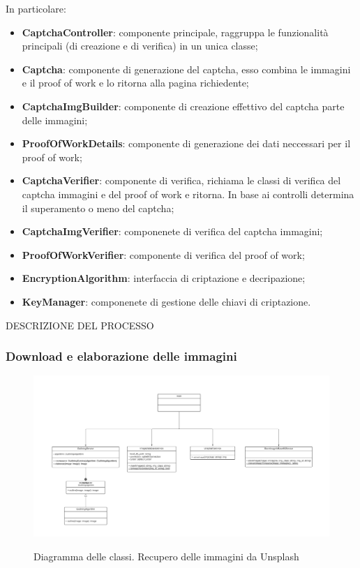 In particolare:
\begin{itemize}
    \item \textbf{CaptchaController}: componente principale, raggruppa le funzionalità principali (di creazione e di verifica) in un unica classe;
    \item \textbf{Captcha}: componente di generazione del captcha, esso combina le immagini e il proof of work e lo ritorna alla pagina richiedente;
    \item \textbf{CaptchaImgBuilder}: componente di creazione effettivo del captcha parte delle immagini;
    \item \textbf{ProofOfWorkDetails}: componente di generazione dei dati neccessari per il proof of work;
    \item \textbf{CaptchaVerifier}: componente di verifica, richiama le classi di verifica del captcha immagini e del proof of work e ritorna. In base ai controlli determina il superamento o meno del captcha;
    \item \textbf{CaptchaImgVerifier}: componenete di verifica del captcha immagini;
    \item \textbf{ProofOfWorkVerifier}: componente di verifica del proof of work;
    \item \textbf{EncryptionAlgorithm}: interfaccia di criptazione e decripazione;
    \item \textbf{KeyManager}: componenete di gestione delle chiavi di criptazione.
\end{itemize}

DESCRIZIONE DEL PROCESSO

\subsubsection{Download e elaborazione delle immagini}

\begin{figure}[H]
    \centering
    \includegraphics[scale = 1.0]{img/downloadImg.png}\\
    \caption{Diagramma delle classi. Recupero delle immagini da Unsplash}
\end{figure}

